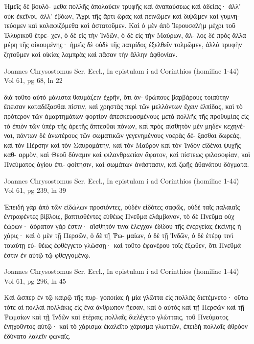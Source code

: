 \documentclass[12pt,letterpaper,twoside,final]{memoir}
\begin{document}
\begin{greek}
                                        Ἡμεῖς δὲ βουλό-
μεθα πολλῆς ἀπολαύειν τρυφῆς καὶ ἀναπαύσεως καὶ 
ἀδείας· ἀλλ' οὐκ ἐκεῖνοι, ἀλλ' ἐβόων, Ἄχρι τῆς 
ἄρτι ὥρας καὶ πεινῶμεν καὶ διψῶμεν καὶ γυμνη-
τεύομεν καὶ κολαφιζόμεθα καὶ ἀστατοῦμεν. Καὶ 
ὁ μὲν ἀπὸ Ἱερουσαλὴμ μέχρι τοῦ Ἰλλυρικοῦ ἔτρε-
χεν, ὁ δὲ εἰς τὴν Ἰνδῶν, ὁ δὲ εἰς τὴν Μαύρων, ἄλ-
λος δὲ πρὸς ἄλλα μέρη τῆς οἰκουμένης· ἡμεῖς δὲ 
οὐδὲ τῆς πατρίδος ἐξελθεῖν τολμῶμεν, ἀλλὰ τρυφὴν 
ζητοῦμεν καὶ οἰκίας λαμπρὰς καὶ πᾶσαν τὴν ἄλλην 
ἀφθονίαν. 



Joannes Chrysostomus Scr. Eccl., In epistulam i ad Corinthios (homiliae 1-44) 
Vol 61, pg 68, ln 22

διὰ τοῦτο αὐτὸ μάλιστα θαυμάζειν ἐχρῆν, ὅτι ἀν-
θρώπους βαρβάρους τοιαύτην ἔπεισαν καταδέξασθαι 
πίστιν, καὶ χρηστὰς περὶ τῶν μελλόντων ἔχειν 
ἐλπίδας, καὶ τὸ πρότερον τῶν ἁμαρτημάτων φορτίον 
ἀπεσκευασμένους μετὰ πολλῆς τῆς προθυμίας εἰς τὸ 
ἐπιὸν τῶν ὑπὲρ τῆς ἀρετῆς ἅπτεσθαι πόνων, καὶ 
πρὸς αἰσθητὸν μὲν μηδὲν κεχηνέναι, πάντων δὲ 
ἀνωτέρους τῶν σωματικῶν γεγενημένους νοερὰς δέ-
ξασθαι δωρεὰς, καὶ τὸν Πέρσην καὶ τὸν Σαυρομάτην, 
καὶ τὸν Μαῦρον καὶ τὸν Ἰνδὸν εἰδέναι ψυχῆς καθ-
αρμὸν, καὶ Θεοῦ δύναμιν καὶ φιλανθρωπίαν ἄφατον, 
καὶ πίστεως φιλοσοφίαν, καὶ Πνεύματος ἁγίου ἐπι-
φοίτησιν, καὶ σωμάτων ἀνάστασιν, καὶ ζωῆς ἀθανάτου 
δόγματα. 



Joannes Chrysostomus Scr. Eccl., In epistulam i ad Corinthios (homiliae 1-44) 
Vol 61, pg 239, ln 39

                        Ἐπειδὴ γὰρ ἀπὸ τῶν εἰδώλων 
προσιόντες, οὐδὲν εἰδότες σαφῶς, οὐδὲ ταῖς παλαιαῖς 
ἐντραφέντες βίβλοις, βαπτισθέντες εὐθέως Πνεῦμα 
ἐλάμβανον, τὸ δὲ Πνεῦμα οὐχ ἑώρων· ἀόρατον γάρ 
ἐστιν· αἴσθητόν τινα ἔλεγχον ἐδίδου τῆς ἐνεργείας 
ἐκείνης ἡ χάρις· καὶ ὁ μὲν τῇ Περσῶν, ὁ δὲ τῇ Ῥω-
μαίων, ὁ δὲ τῇ Ἰνδῶν, ὁ δὲ ἑτέρᾳ τινὶ τοιαύτῃ εὐ-
θέως ἐφθέγγετο γλώσσῃ· καὶ τοῦτο ἐφανέρου τοῖς 
ἔξωθεν, ὅτι Πνεῦμά ἐστιν ἐν αὐτῷ τῷ φθεγγομένῳ. 



Joannes Chrysostomus Scr. Eccl., In epistulam i ad Corinthios (homiliae 1-44) 
Vol 61, pg 296, ln 45

                  Καὶ ὥσπερ ἐν τῷ καιρῷ τῆς πυρ-
γοποιίας ἡ μία γλῶττα εἰς πολλὰς διετέμνετο· οὕτω 
τότε αἱ πολλαὶ πολλάκις εἰς ἕνα ἄνθρωπον ᾔεσαν, καὶ 
ὁ αὐτὸς καὶ τῇ Περσῶν καὶ τῇ Ῥωμαίων καὶ τῇ 
Ἰνδῶν καὶ ἑτέραις πολλαῖς διελέγετο γλώτταις, τοῦ 
Πνεύματος ἐνηχοῦντος αὐτῷ· καὶ τὸ χάρισμα ἐκαλεῖτο 
χάρισμα γλωττῶν, ἐπειδὴ πολλαῖς ἀθρόον ἐδύνατο 
λαλεῖν φωναῖς. 




\end{greek}
\end{document}
